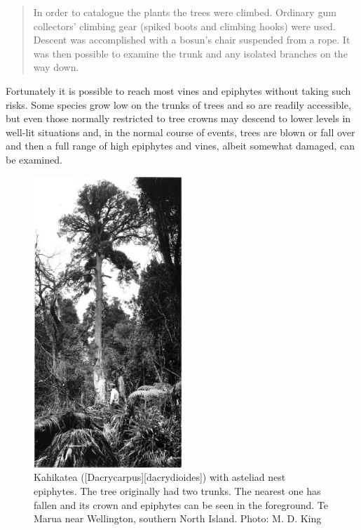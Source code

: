 \begin{quote}
	In order to catalogue the plants the trees were climbed.
	Ordinary gum collectors' climbing gear (spiked boots and climbing hooks) were used.
	Descent was accomplished with a bosun's chair suspended from a rope.
	It was then possible to examine the trunk and any isolated branches on the way down.
\end{quote}

Fortunately it is possible to reach most vines and epiphytes without taking such risks.
Some species grow low on the trunks of trees and so are readily accessible, but even those normally restricted to tree crowns may descend to lower levels in well-lit situations and, in the normal course of events, trees are blown or fall over and then a full range of high epiphytes and vines, albeit somewhat damaged, can be examined.

\begin{figure}
	\includegraphics[width=0.5\textwidth]{graphics/figure26kahikatea.jpg}
	\centering
	\caption[Kahikatea with asteliad nest epiphytes]{Kahikatea ([Dacrycarpus][dacrydioides]) with asteliad nest epiphytes.
	The tree originally had two trunks.
	The nearest one has fallen and its crown and epiphytes can be seen in the foreground.
	Te Marua near Wellington, southern North Island.
	Photo: M. D. King}%
	\label{fig:26kahikatea}
\end{figure}

